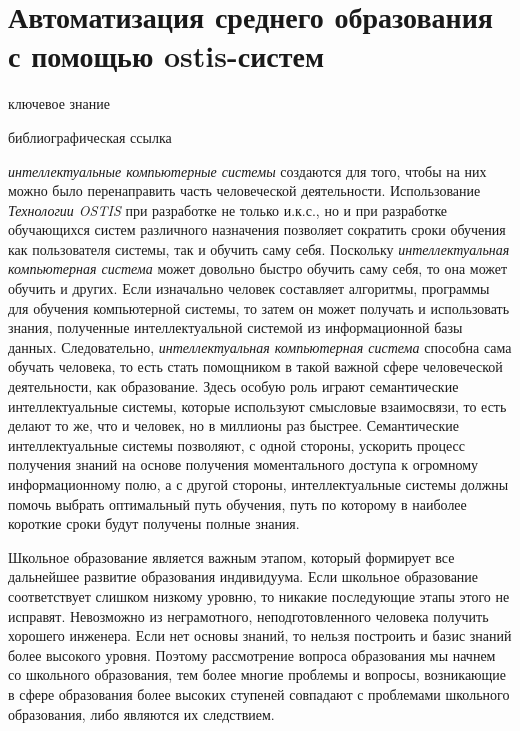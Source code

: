 \section{Автоматизация среднего образования с помощью ostis-систем}
\label{sec_automation_secondary_education}

\begin{SCn}
	
	\bigskip
	
	\begin{scnrelfromlist}{ключевое знание}
	\end{scnrelfromlist}
	
	\bigskip
	
	\begin{scnrelfromlist}{библиографическая ссылка}
	\end{scnrelfromlist}
	
\end{SCn}

\textit{интеллектуальные компьютерные системы} создаются для того, чтобы на них можно было перенаправить часть человеческой деятельности. Использование \textit{Технологии OSTIS} при разработке не только и.к.с., но и при разработке обучающихся систем различного назначения позволяет сократить сроки обучения как пользователя системы, так и обучить саму себя. Поскольку \textit{интеллектуальная компьютерная система} может довольно быстро обучить саму себя, то она может обучить и других. Если изначально человек составляет алгоритмы, программы для обучения компьютерной системы, то затем он может получать и использовать знания, полученные интеллектуальной системой из информационной базы данных. Следовательно, \textit{интеллектуальная компьютерная система} способна сама обучать человека, то есть стать помощником в такой важной сфере человеческой деятельности, как образование. Здесь особую роль играют семантические интеллектуальные системы, которые используют смысловые взаимосвязи, то есть делают то же, что и человек, но в миллионы раз быстрее. Семантические интеллектуальные системы позволяют, с одной стороны, ускорить процесс получения знаний на основе получения моментального доступа к огромному информационному полю, а с другой стороны, интеллектуальные системы должны помочь выбрать оптимальный путь обучения, путь по которому в наиболее короткие сроки будут получены полные знания.

Школьное образование является важным этапом, который формирует все дальнейшее развитие образования индивидуума. Если школьное образование соответствует слишком низкому уровню, то никакие последующие этапы этого не исправят. Невозможно из неграмотного, неподготовленного человека получить хорошего инженера. Если нет основы знаний, то нельзя построить и базис знаний более высокого уровня. Поэтому рассмотрение вопроса образования мы начнем со школьного образования, тем более многие проблемы и вопросы, возникающие в сфере образования более высоких ступеней совпадают с проблемами школьного образования, либо являются их следствием.

